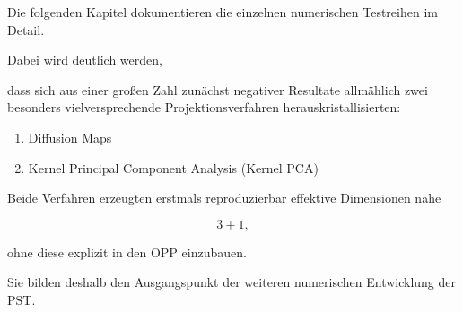 Die folgenden Kapitel dokumentieren die einzelnen numerischen Testreihen im Detail.

Dabei wird deutlich werden,

dass sich aus einer großen Zahl zunächst negativer Resultate allmählich zwei besonders vielversprechende Projektionsverfahren herauskristallisierten:

\begin{enumerate}

\item Diffusion Maps

\item Kernel Principal Component Analysis (Kernel PCA)

\end{enumerate}

Beide Verfahren erzeugten erstmals reproduzierbar effektive Dimensionen nahe

\[
3+1,
\]

ohne diese explizit in den OPP einzubauen.

Sie bilden deshalb den Ausgangspunkt der weiteren numerischen Entwicklung der PST.

